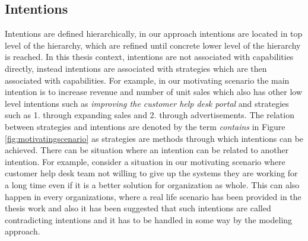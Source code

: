 \subsection{Intentions} 
\label{sec:intentions}
Intentions are defined hierarchically, in our approach intentions are located in top level of the hierarchy, which are refined until concrete lower level of the hierarchy is reached. In this thesis context, intentions are not associated with capabilities directly, instead intentions are associated with strategies which are then associated with capabilities. For example, in our motivating scenario the main intention is to increase revenue and number of unit sales which also has other low level intentions such as \textit{improving the customer help desk portal} and strategies such as 1. through expanding sales and 2. through advertisements. The relation between strategies and intentions are denoted by the term \textit{contains} in Figure \ref{fig:motivatingscenario} as strategies are methods through which intentions can be achieved. There can be situation where an intention can be related to another intention. For example, consider a situation in our motivating scenario where customer help desk team not willing to give up the systems they are working for a long time even if it is a better solution for organization as whole. This can also happen in every organizations, where a real life scenario has been provided in the thesis work \cite{Sierr2015} and also it has been suggested that such intentions are called contradicting intentions and it has to be handled in some way by the modeling approach. 

